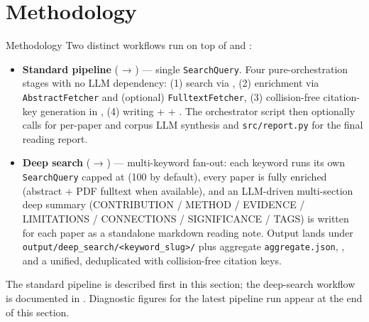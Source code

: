 \documentclass[
  ignorenonframetext,
]{beamer}
\author{\texorpdfstring{}{}}
\date{}
\providecommand{\tightlist}{%
  \setlength{\itemsep}{0pt}\setlength{\parskip}{0pt}}
\begin{document}
\section{Methodology}\label{sec:methodology}

\begin{frame}{Methodology}
Two distinct workflows run on top of
 and
:

\begin{itemize}
\tightlist
\item
  \textbf{Standard pipeline} (
  → ) --- single
  \texttt{SearchQuery}. Four pure-orchestration stages with no LLM
  dependency: (1) search via , (2) enrichment
  via \texttt{AbstractFetcher} and (optional) \texttt{FulltextFetcher},
  (3) collision-free citation-key generation in
  , (4) writing
   +  +
  . The orchestrator script then
  optionally calls  for per-paper and corpus
  LLM synthesis and \texttt{src/report.py} for the final reading report.
\item
  \textbf{Deep search} ( →
  ) --- multi-keyword
  fan-out: each keyword runs its own \texttt{SearchQuery} capped at
   (100 by default), every paper is
  fully enriched (abstract + PDF fulltext when available), and an
  LLM-driven multi-section deep summary (CONTRIBUTION / METHOD /
  EVIDENCE / LIMITATIONS / CONNECTIONS / SIGNIFICANCE / TAGS) is written
  for each paper as a standalone markdown reading note. Output lands
  under
  \texttt{output/deep\_search/\textless{}keyword\_slug\textgreater{}/}
  plus aggregate \texttt{aggregate.json}, ,
  and a unified, deduplicated 
  with collision-free citation keys.
\end{itemize}

The standard pipeline is described first in this section; the
deep-search workflow is documented in .
Diagnostic figures for the latest pipeline run appear at the end of this
section.
\end{frame}
\end{document}
